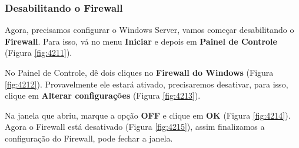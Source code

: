 \documentclass[10pt]{article}
\begin{document}
\subsubsection{Desabilitando o Firewall}
\par Agora, precisamos configurar o Windows Server, vamos começar desabilitando o \textbf{Firewall}. Para isso, vá no menu \textbf{Iniciar} e depois em \textbf{Painel de Controle} (Figura \ref{fig:4211}).
\par No Painel de Controle, dê dois cliques no \textbf{Firewall do Windows} (Figura \ref{fig:4212}). Provavelmente ele estará ativado, precisaremos desativar, para isso, clique em \textbf{Alterar configurações} (Figura \ref{fig:4213}).
\par Na janela que abriu, marque a opção \textbf{OFF} e clique em \textbf{OK} (Figura \ref{fig:4214}). Agora o Firewall está desativado (Figura \ref{fig:4215}), assim finalizamos a configuração do Firewall, pode fechar a janela.
\end{document}
